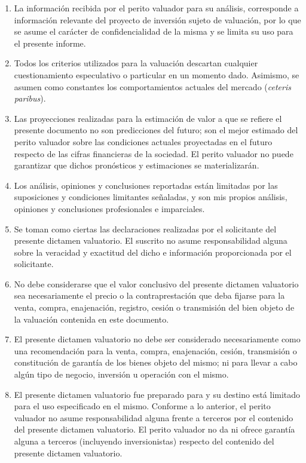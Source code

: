 \begin{enumerate}[\indent a)]
\item La informaci\'on recibida por el perito valuador para su an\'alisis, corresponde a informaci\'on relevante del proyecto de inversi\'on sujeto de valuaci\'on, por lo que se asume el car\'acter de confidencialidad de la misma y se limita su uso para el presente informe.

\item Todos los criterios utilizados para la valuaci\'on descartan cualquier cuestionamiento especulativo o particular en un momento dado. Asimismo, se asumen como constantes los comportamientos actuales del mercado (\textit{ceteris paribus}).

\item Las proyecciones realizadas para la estimaci\'on de valor a que se refiere el presente documento no son predicciones del futuro; son el mejor estimado del perito valuador sobre las condiciones actuales proyectadas en el futuro respecto de las cifras financieras de la sociedad. El perito valuador no puede garantizar que dichos pron\'osticos y estimaciones se materializar\'an.

\item Los an\'alisis, opiniones y conclusiones reportadas est\'an limitadas por las suposiciones y condiciones limitantes se\~naladas, y son mis propios an\'alisis, opiniones y conclusiones profesionales e imparciales.

\item Se toman como ciertas las declaraciones realizadas por el solicitante del presente dictamen valuatorio. El suscrito no asume responsabilidad alguna sobre la veracidad y exactitud del dicho e informaci\'on proporcionada por el solicitante.

\item No debe considerarse que el valor conclusivo del presente dictamen valuatorio sea necesariamente el precio o la contraprestaci\'on que deba fijarse para la venta, compra, enajenaci\'on, registro, cesi\'on o transmisi\'on del bien objeto de la valuaci\'on   contenida en este documento.

\item El presente dictamen valuatorio no debe ser considerado necesariamente como una recomendaci\'on para la venta, compra, enajenaci\'on, cesi\'on, transmisi\'on o constituci\'on de garant\'ia de los bienes objeto del mismo; ni para llevar a cabo alg\'un tipo de negocio, inversi\'on u operaci\'on con el mismo.

\item El presente dictamen valuatorio fue preparado para \textcolor{principal}{\empresaSolicitante}{} y su destino est\'a limitado para el uso especificado  en el mismo. Conforme a lo anterior, el perito valuador no asume responsabilidad alguna frente a terceros por el contenido del presente dictamen valuatorio. El perito valuador no da ni ofrece garant\'ia alguna a terceros (incluyendo inversionistas) respecto del contenido del presente dictamen valuatorio.


\end{enumerate}
